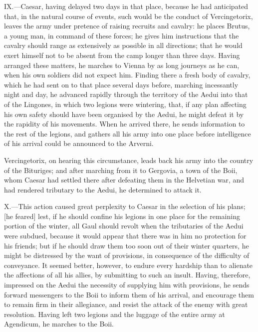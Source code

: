 IX.—Caesar, having delayed two days in that place, because he had
anticipated that, in the natural course of events, such would be the
conduct of Vercingetorix, leaves the army under pretence of raising
recruits and cavalry: he places Brutus, a young man, in command of these
forces; he gives him instructions that the cavalry should range as
extensively as possible in all directions; that he would exert himself
not to be absent from the camp longer than three days. Having arranged
these matters, he marches to Vienna by as long journeys as he can, when
his own soldiers did not expect him. Finding there a fresh body of
cavalry, which he had sent on to that place several days before,
marching incessantly night and day, he advanced rapidly through the
territory of the Aedui into that of the Lingones, in which two legions
were wintering, that, if any plan affecting his own safety should have
been organised by the Aedui, he might defeat it by the rapidity of his
movements. When he arrived there, he sends information to the rest of
the legions, and gathers all his army into one place before intelligence
of his arrival could be announced to the Arverni.

Vercingetorix, on hearing this circumstance, leads back his army into
the country of the Bituriges; and after marching from it to Gergovia, a
town of the Boii, whom Caesar had settled there after defeating them in
the Helvetian war, and had rendered tributary to the Aedui, he
determined to attack it.

X.—This action caused great perplexity to Caesar in the selection of
his plans; [he feared] lest, if he should confine his legions in one
place for the remaining portion of the winter, all Gaul should revolt
when the tributaries of the Aedui were subdued, because it would appear
that there was in him no protection for his friends; but if he should
draw them too soon out of their winter quarters, he might be distressed
by the want of provisions, in consequence of the difficulty of
conveyance. It seemed better, however, to endure every hardship than to
alienate the affections of all his allies, by submitting to such an
insult. Having, therefore, impressed on the Aedui the necessity of
supplying him with provisions, he sends forward messengers to the Boii
to inform them of his arrival, and encourage them to remain firm in
their allegiance, and resist the attack of the enemy with great
resolution. Having left two legions and the luggage of the entire army
at Agendicum, he marches to the Boii.

